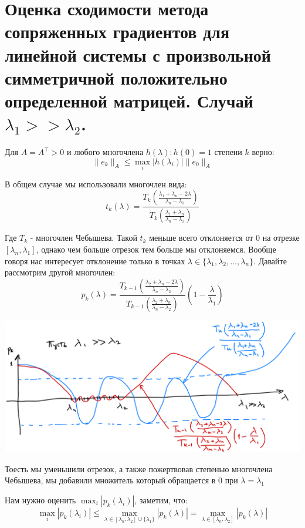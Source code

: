 \section{Оценка сходимости метода сопряженных градиентов для линейной системы с произвольной симметричной положительно определенной матрицей. Случай $\lambda_1 >> \lambda_2$.}

\begin{proposal}
	Для $A = A^\top > 0$ и любого многочлена $h(\lambda): h(0) = 1$ степени $k$ верно:
	$$\|e_k\|_A \le \max_i |h(\lambda_i)|\|e_0\|_A$$
\end{proposal}

В общем случае мы использовали многочлен вида:
$$t_k(\lambda) = \frac{T_k\left(\frac{\lambda_1 + \lambda_n - 2 \lambda}{\lambda_n-\lambda_1}\right)}{T_k\left(\frac{\lambda_1 + \lambda_n}{\lambda_n-\lambda_1}\right)}$$

Где $T_k$ - многочлен Чебышева. Такой $t_k$ меньше всего отклоняется от 0 на отрезке $[\lambda_n, \lambda_1]$, однако чем больше отрезок тем больше мы отклоняемся. Вообще говоря нас интересует отклонение только в точках $\lambda \in \{\lambda_1, \lambda_2, \dots, \lambda_n\}$. Давайте рассмотрим другой многочлен:
$$p_k(\lambda) = \frac{T_{k-1}\left(\frac{\lambda_2 + \lambda_n - 2 \lambda}{\lambda_n-\lambda_2}\right)}{T_{k-1}\left(\frac{\lambda_2 + \lambda_n}{\lambda_n-\lambda_2}\right)}\left(1-\frac{\lambda}{\lambda_1}\right)$$


\begin{center}
	\includegraphics[scale=0.3]{img/q5_1} \\
\end{center}

Тоесть мы уменьшили отрезок, а также пожертвовав степенью многочлена Чебышева, мы добавили множитель который обращается в 0 при $\lambda = \lambda_1$

Нам нужно оценить $\max_i |p_k(\lambda_i)|$, заметим, что:
$$\max_i |p_k(\lambda_i)| \le \max_{\lambda \in [\lambda_{n}, \lambda_2]\cup \{\lambda_1\}}|p_k(\lambda)| = \max_{\lambda \in [\lambda_{n}, \lambda_2]}|p_k(\lambda)|$$

